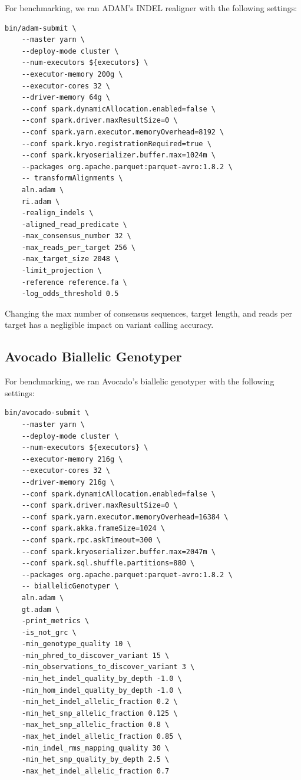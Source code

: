 \documentclass[phd]{ucbthesis}
\begin{document}
For benchmarking, we ran ADAM's INDEL realigner with the following settings:

\begin{lstlisting}[caption=ADAM INDEL Realignment Command]
bin/adam-submit \
    --master yarn \
    --deploy-mode cluster \
    --num-executors ${executors} \
    --executor-memory 200g \
    --executor-cores 32 \
    --driver-memory 64g \
    --conf spark.dynamicAllocation.enabled=false \
    --conf spark.driver.maxResultSize=0 \
    --conf spark.yarn.executor.memoryOverhead=8192 \
    --conf spark.kryo.registrationRequired=true \
    --conf spark.kryoserializer.buffer.max=1024m \
    --packages org.apache.parquet:parquet-avro:1.8.2 \
    -- transformAlignments \
    aln.adam \
    ri.adam \
    -realign_indels \
    -aligned_read_predicate \
    -max_consensus_number 32 \
    -max_reads_per_target 256 \
    -max_target_size 2048 \
    -limit_projection \
    -reference reference.fa \
    -log_odds_threshold 0.5
\end{lstlisting}

Changing the max number of consensus sequences, target length, and reads per
target has a negligible impact on variant calling accuracy.

\subsection{Avocado Biallelic Genotyper}
\label{sec:avocado-bg}

For benchmarking, we ran Avocado's biallelic genotyper with the following
settings:

\begin{lstlisting}[caption=Avocado Biallelic Genotyper Command]
bin/avocado-submit \
    --master yarn \
    --deploy-mode cluster \
    --num-executors ${executors} \
    --executor-memory 216g \
    --executor-cores 32 \
    --driver-memory 216g \
    --conf spark.dynamicAllocation.enabled=false \
    --conf spark.driver.maxResultSize=0 \
    --conf spark.yarn.executor.memoryOverhead=16384 \
    --conf spark.akka.frameSize=1024 \
    --conf spark.rpc.askTimeout=300 \
    --conf spark.kryoserializer.buffer.max=2047m \
    --conf spark.sql.shuffle.partitions=880 \
    --packages org.apache.parquet:parquet-avro:1.8.2 \
    -- biallelicGenotyper \
    aln.adam \
    gt.adam \
    -print_metrics \
    -is_not_grc \
    -min_genotype_quality 10 \
    -min_phred_to_discover_variant 15 \
    -min_observations_to_discover_variant 3 \
    -min_het_indel_quality_by_depth -1.0 \
    -min_hom_indel_quality_by_depth -1.0 \
    -min_het_indel_allelic_fraction 0.2 \
    -min_het_snp_allelic_fraction 0.125 \
    -max_het_snp_allelic_fraction 0.8 \
    -max_het_indel_allelic_fraction 0.85 \
    -min_indel_rms_mapping_quality 30 \
    -min_het_snp_quality_by_depth 2.5 \
    -max_het_indel_allelic_fraction 0.7
\end{lstlisting}
\end{document}
